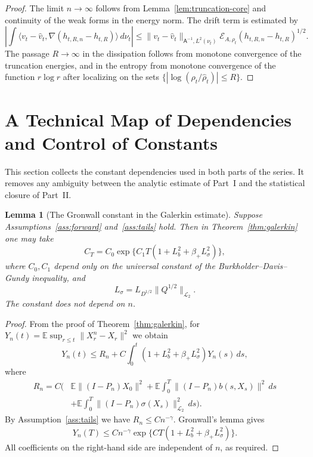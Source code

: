 \documentclass{article}
\newtheorem{lemma}[theorem]{Lemma}
\newcommand{\LLtwo}{\mathcal L_2}
\newcommand{\E}{\mathbb E}
\newcommand{\Asf}{\mathsf A}
\begin{document}
\begin{proof}
The limit \(n\to\infty\) follows from Lemma~\ref{lem:truncation-core} and
continuity of the weak forms in the energy norm. The drift term is estimated
by
\[
        \left|\int\langle v_t-\hat v_t,
        \nabla(h_{t,R,n}-h_{t,R})\rangle\,d\nu_t\right|
        \le
        \|v_t-\hat v_t\|_{\Asf^{-1},L^2(\nu_t)}
        \mathcal E_{A,\rho_t}(h_{t,R,n}-h_{t,R})^{1/2}.
\]
The passage \(R\to\infty\) in the dissipation follows from monotone
convergence of the truncation energies, and in the entropy from monotone
convergence of the function \(r\log r\) after localizing on the sets
\(\{|\log(\rho_t/\hat\rho_t)|\le R\}\).
\end{proof}


\section{A Technical Map of Dependencies and Control of Constants}
\label{sec:part1-constants-map}

This section collects the constant dependencies used in both parts of the
series. It removes any ambiguity between the analytic estimate of Part~I and
the statistical closure of Part~II.

\begin{lemma}[The Gronwall constant in the Galerkin estimate]
\label{lem:gronwall-constant-explicit}
Suppose Assumptions~\ref{ass:forward} and~\ref{ass:tails} hold. Then in
Theorem~\ref{thm:galerkin} one may take
\[
        C_T=C_0\exp\{C_1T(1+L_b^2+\beta_+L_\sigma^2)\},
\]
where \(C_0,C_1\) depend only on the universal constant of the
Burkholder--Davis--Gundy inequality, and
\[
        L_\sigma=L_{D^{1/2}}\|Q^{1/2}\|_{\LLtwo}.
\]
The constant does not depend on \(n\).
\end{lemma}

\begin{proof}
From the proof of Theorem~\ref{thm:galerkin}, for
\(Y_n(t)=\E\sup_{r\le t}\|X_r^n-X_r\|^2\) we obtain
\[
        Y_n(t)\le R_n+C\int_0^t(1+L_b^2+\beta_+L_\sigma^2)Y_n(s)\,ds,
\]
where
\[
\begin{aligned}
        R_n=C\Big(&\E\|(I-P_n)X_0\|^2
        +\E\int_0^T\|(I-P_n)b(s,X_s)\|^2\,ds\\
        &+\E\int_0^T\|(I-P_n)\sigma(X_s)\|_{\LLtwo}^2\,ds\Big).
\end{aligned}
\]
By Assumption~\ref{ass:tails} we have \(R_n\le Cn^{-\gamma}\). Gronwall's
lemma gives
\[
        Y_n(T)
        \le
        Cn^{-\gamma}
        \exp\{C T(1+L_b^2+\beta_+L_\sigma^2)\}.
\]
All coefficients on the right-hand side are independent of \(n\), as required.
\end{proof}
\end{document}
